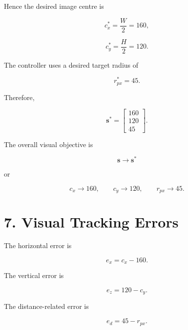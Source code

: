 \documentclass[12pt,a4paper]{article}
\begin{document}
Hence the desired image centre is

\begin{equation}
c_x^*=\frac{W}{2}=160,
\end{equation}

\begin{equation}
c_y^*=\frac{H}{2}=120.
\end{equation}

The controller uses a desired target radius of

\begin{equation}
r_{px}^*=45.
\end{equation}

Therefore,

\begin{equation}
\boxed{
\mathbf{s}^*=
\begin{bmatrix}
160\\120\\45
\end{bmatrix}.
}
\end{equation}

The overall visual objective is

\begin{equation}
\boxed{
\mathbf{s}\rightarrow\mathbf{s}^*
}
\end{equation}

or

\begin{equation}
\boxed{
c_x\rightarrow160,\qquad
c_y\rightarrow120,\qquad
r_{px}\rightarrow45.
}
\end{equation}

\section{7. Visual Tracking Errors}

The horizontal error is

\begin{equation}
\boxed{
e_x=c_x-160.
}
\end{equation}

The vertical error is

\begin{equation}
\boxed{
e_z=120-c_y.
}
\end{equation}

The distance-related error is

\begin{equation}
\boxed{
e_d=45-r_{px}.
}
\end{equation}
\end{document}
